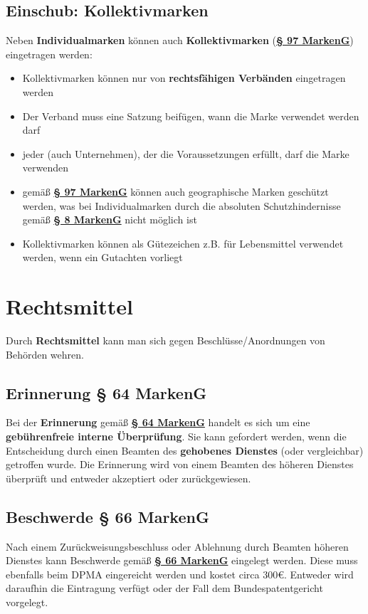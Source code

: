 \documentclass[12pt,A4]{extarticle}
\newcommand{\highlight}[1]{\textcolor{highlightColor}{\textbf{#1}}}
\newcommand{\markenG}[2][]{\textbf{\textcolor{markenGesetzLink}{\href{https://www.gesetze-im-internet.de/markeng/__#2.html}{§ #2 \ifthenelse{\equal{#1}{}}{}{#1 }MarkenG}}}}
\begin{document}
\subsection{Einschub: Kollektivmarken}
Neben \highlight{Individualmarken} können auch \highlight{Kollektivmarken} (\markenG{97}) eingetragen werden:
\begin{itemize}
  \item{Kollektivmarken können nur von \textbf{rechtsfähigen Verbänden} eingetragen werden}
  \item{Der Verband muss eine Satzung beifügen, wann die Marke verwendet werden darf}
  \item{jeder (auch Unternehmen), der die Voraussetzungen erfüllt, darf die Marke verwenden}
  \item{gemäß \markenG[Abs. 1]{97} können auch geographische Marken geschützt werden, was bei Individualmarken durch die absoluten Schutzhindernisse gemäß \markenG[Abs. 2 S. 2]{8} nicht möglich ist}
  \item{Kollektivmarken können als Gütezeichen z.B. für Lebensmittel verwendet werden, wenn ein Gutachten vorliegt}
\end{itemize}

\section{Rechtsmittel}
Durch \textbf{Rechtsmittel} kann man sich gegen Beschlüsse/Anordnungen von Behörden wehren.

\subsection{Erinnerung § 64 MarkenG}
Bei der \highlight{Erinnerung} gemäß \markenG{64} handelt es sich um eine \textbf{gebührenfreie interne Überprüfung}. Sie kann gefordert werden, wenn die Entscheidung durch einen Beamten des \textbf{gehobenes Dienstes} (oder vergleichbar) getroffen wurde. Die Erinnerung wird von einem Beamten des höheren Dienstes überprüft und entweder akzeptiert oder zurückgewiesen.

\subsection{Beschwerde § 66 MarkenG}
Nach einem Zurückweisungsbeschluss oder Ablehnung durch Beamten höheren Dienstes kann Beschwerde gemäß \markenG{66} eingelegt werden. Diese muss ebenfalls beim DPMA eingereicht werden und kostet circa 300€. Entweder wird daraufhin die Eintragung verfügt oder der Fall dem Bundespatentgericht vorgelegt.
\end{document}
